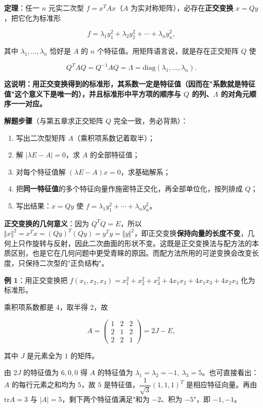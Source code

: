 \documentclass[11pt,openany,UTF8]{ctexbook}
\begin{document}
\textbf{定理}：任一 $n$ 元实二次型 $f=x^TAx$（$A$ 为实对称矩阵），必存在\textbf{正交变换} $x=Qy$，把它化为标准形

\[f=\lambda_1y_1^2+\lambda_2y_2^2+\cdots+\lambda_ny_n^2,\]

其中 $\lambda_1,\dots,\lambda_n$ 恰好是 $A$ 的 $n$ 个特征值。用矩阵语言说，就是存在正交矩阵 $Q$ 使

\[Q^TAQ=Q^{-1}AQ=\Lambda=\mathrm{diag}(\lambda_1,\dots,\lambda_n).\]

\textbf{这说明：用正交变换得到的标准形，其系数一定是特征值（因而在"系数就是特征值"这个意义下是唯一的），并且标准形中平方项的顺序与 $Q$ 的列、$\Lambda$ 的对角元顺序一一对应。}

\textbf{解题步骤}（与第五章求正交矩阵 $Q$ 完全一致，务必背熟）：

\begin{enumerate}
\item 写出二次型矩阵 $A$（乘积项系数记着取半）；
\item 解 $\vert\lambda E-A\vert=0$，求 $A$ 的全部特征值；
\item 对每个特征值解 $(\lambda E-A)x=0$，求基础解系；
\item 把\textbf{同一特征值}的多个特征向量作施密特正交化，再全部单位化，按列排成 $Q$；
\item 写出结果：$x=Qy$ 使 $f=\lambda_1y_1^2+\cdots+\lambda_ny_n^2$。
\end{enumerate}
\textbf{正交变换的几何意义}：因为 $Q^TQ=E$，所以 $\Vert x\Vert^2=x^Tx=(Qy)^T(Qy)=y^Ty=\Vert y\Vert^2$，即正交变换\textbf{保持向量的长度不变}，几何上只作旋转与反射，因此二次曲面的形状不变。这既是正交变换法与配方法的本质区别，也是它在几何问题中更受青睐的原因。而配方法所用的可逆变换会改变长度，只保持二次型的"正负结构"。

\textbf{例 1}：用正交变换把 $f(x_1,x_2,x_3)=x_1^2+x_2^2+x_3^2+4x_1x_2+4x_1x_3+4x_2x_3$ 化为标准形。

乘积项系数都是 $4$，取半得 $2$，故

\[A=\begin{pmatrix}1&2&2\\2&1&2\\2&2&1\end{pmatrix}=2J-E,\]

其中 $J$ 是元素全为 $1$ 的矩阵。

由 $2J$ 的特征值为 $6,0,0$ 得 $A$ 的特征值为 $\lambda_1=\lambda_2=-1,\ \lambda_3=5$。也可直接看出：$A$ 的每行元素之和均为 $5$，故 $5$ 是特征值，$\dfrac1{\sqrt3}(1,1,1)^T$ 是相应特征向量。再由 $\mathrm{tr}A=3$ 与 $\vert A\vert=5$，剩下两个特征值满足"和为 $-2$、积为 $-5$"，即 $-1,-1$。
\end{document}
